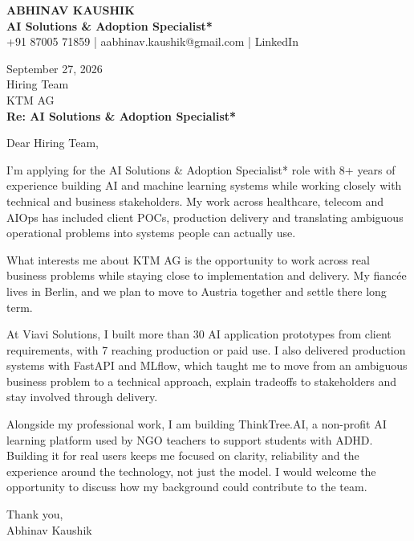 \documentclass[10pt,a4paper]{article}
\begin{document}
\begin{center}
{\Large\bfseries ABHINAV KAUSHIK}\\[2pt]
{\bfseries AI Solutions \& Adoption Specialist*}\\[2pt]
+91 87005 71859 \quad | \quad aabhinav.kaushik@gmail.com \quad | \quad LinkedIn
\end{center}
\vspace{8pt}
September 27, 2026\\[6pt]
Hiring Team\\
KTM AG\\[4pt]
\textbf{Re: AI Solutions \& Adoption Specialist*}

Dear Hiring Team,

I’m applying for the AI Solutions \& Adoption Specialist* role with 8+ years of experience building AI and machine learning systems while working closely with technical and business stakeholders. My work across healthcare, telecom and AIOps has included client POCs, production delivery and translating ambiguous operational problems into systems people can actually use.

What interests me about KTM AG is the opportunity to work across real business problems while staying close to implementation and delivery. My fiancée lives in Berlin, and we plan to move to Austria together and settle there long term.

At Viavi Solutions, I built more than 30 AI application prototypes from client requirements, with 7 reaching production or paid use. I also delivered production systems with FastAPI and MLflow, which taught me to move from an ambiguous business problem to a technical approach, explain tradeoffs to stakeholders and stay involved through delivery.

Alongside my professional work, I am building ThinkTree.AI, a non-profit AI learning platform used by NGO teachers to support students with ADHD. Building it for real users keeps me focused on clarity, reliability and the experience around the technology, not just the model. I would welcome the opportunity to discuss how my background could contribute to the team.

Thank you,\\
Abhinav Kaushik
\end{document}
